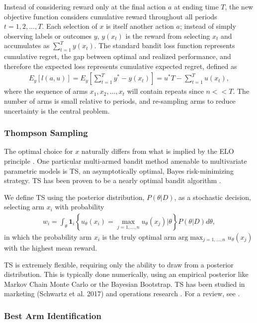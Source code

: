 \documentclass[nonblindrev]{informs3}
\begin{document}
Instead of considering reward only at the final action $a$ at ending time $T$, the new objective function considers cumulative reward throughout all periods $t=1,2,...,T$. Each selection of $x$ is itself another action $a$; instead of simply observing labels or outcomes $y$, $y(x_t)$ is the reward from selecting $x_t$ and accumulates as $\sum_{t=1}^{T} y(x_t)$. The standard bandit loss function represents cumulative regret, the gap between optimal and realized performance, and therefore the expected loss represents cumulative expected regret, defined as
\begin{align}
E_y[ l(a,u) ] = E_y[ \sum_{t=1}^{T} y^{*} - y(x_t) ] 
= u^{*}T - \sum_{t=1}^{T} u(x_t), 
\end{align}
where the sequence of arms $x_1,x_2,\ldots,x_t$ will contain repeats since $n << T$. The number of arms is small relative to periods, and re-sampling arms to reduce uncertainty is the central problem. 

\subsubsection{Thompson Sampling}

The optimal choice for $x$ naturally differs from what is implied by the ELO principle \citep{longchapelle2010active}. One particular multi-armed bandit method amenable to multivariate parametric models is TS, an asymptotically optimal, Bayes risk-minimizing strategy. TS has been proven to be a nearly optimal bandit algorithm \citep{RussoVanRoy2015}. 

We define TS using the posterior distribution, $P(\theta|D)$, as a stochastic decision, selecting arm $x_i$ with probability
\begin{align} 
w_i = \int_\theta \mathbf{1}_i\left\{ u_\theta(x_i) = \max_{j=1,\ldots,n} u_\theta(x_j) | \theta \right\} P(\theta|D)d\theta ,
\end{align}
in which the probability arm $x_i$ is the truly optimal arm $\text{arg}\max_{j=1,\ldots,n} u_\theta(x_j)$ with the highest mean reward. 

TS is extremely flexible, requiring only the ability to draw from a posterior distribution. This is typically done numerically, using an empirical posterior like Markov Chain Monte Carlo or the Bayesian Bootstrap. TS has been studied in marketing (Schwartz et al. 2017) and operations research \citep{RussoVanRoy2014}. For a review, see \cite{russo2017tutorial}. 

\subsubsection{Best Arm Identification}
\end{document}
